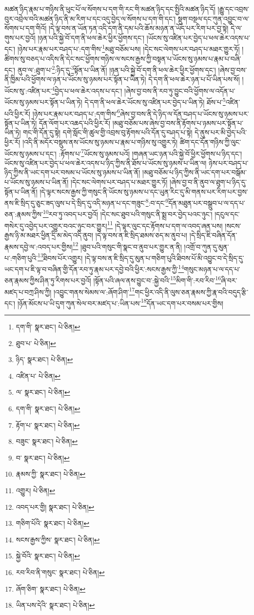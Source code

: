 མཚན་ཉིད་རྣམ་པ་གཉིས་ནི་ཕུང་པོ་ལ་སོགས་པ་དག་གི་རང་གི་མཚན་ཉིད་དང་སྤྱིའི་མཚན་ཉིད་དོ། །རྒྱུ་དང་འབྲས་བུར་འབྲེལ་བའི་མཚན་ཉིད་ནི་མ་རིག་པ་དང་འདུ་བྱེད་ལ་སོགས་པ་དག་གི་དང་། སྡུག་བསྔལ་དང་ཀུན་འབྱུང་བ་ལ་སོགས་པ་དག་གིའོ། །དེ་ལྟ་བས་ན་ཡོན་ཏན་འདི་དག་ནི་དམ་པའི་ཆོས་མཉན་ན་ཡོད་པར་རིག་པར་བྱ་སྟེ། དེ་ལ་གུས་པར་བྱའོ། །ཉན་པའི་སྐྱེ་བོ་དག་ནི་ཕལ་ཆེར་ཕྱིར་ཕྱོགས་དང་། །ཡོངས་སུ་འཛིན་པར་བྱེད་པ་ཕལ་ཆེར་འདས་པ་དང་། །ཉེས་པར་རྣམ་པར་བཤད་པ་:དག་གིས་\footnote{དག་གི་  སྣར་ཐང་།  པེ་ཅིན། }མཐུ་བཅོམ་པས། །དེང་སང་ལེགས་པར་བཤད་པ་མཐར་གྱུར་ཏོ། །ཚིགས་སུ་བཅད་པ་འདིས་ནི་དེང་སང་ཕྱོགས་གཉིས་ལ་སངས་རྒྱས་ཀྱི་བསྟན་པ་ཡོངས་སུ་ཉམས་པ་རྣམ་པ་བཞི་དང་། ནུབ་ལ་:ཐུག་པ་\footnote{ཐུབ་པ་  པེ་ཅིན། }:ཉིད་དུ་\footnote{ཉིད་  སྣར་ཐང་།  པེ་ཅིན། }སྟོན་པ་ཡིན་ནོ། །ཉན་པའི་སྐྱེ་བོ་དག་ནི་ཕལ་ཆེར་ཕྱིར་ཕྱོགས་དང་། །ཞེས་བྱ་བས་ནི་ཁྱིམ་པའི་ཕྱོགས་ལ་ཉན་པ་ཡོངས་སུ་ཉམས་པར་སྟོན་པ་ཡིན་ཏེ། དེ་དག་ནི་ཕལ་ཆེར་ཉན་པ་པོ་ཡིན་པས་སོ། །ཡོངས་སུ་:འཛིན་པར་\footnote{འཛིན་པ་  པེ་ཅིན། }བྱེད་པ་ཕལ་ཆེར་འདས་པ་དང་། །ཞེས་བྱ་བས་ནི་རབ་ཏུ་བྱུང་བའི་ཕྱོགས་ལ་འདོན་པ་ཡོངས་སུ་ཉམས་པར་སྟོན་པ་ཡིན་ཏེ། དེ་དག་ནི་ཕལ་ཆེར་ཡོངས་སུ་འཛིན་པར་བྱེད་པ་ཡིན་ཏེ། ཐོས་པ་\footnote{ལ་  སྣར་ཐང་།  པེ་ཅིན། }འཛིན་པའི་ཕྱིར་རོ། །ཉེས་པར་རྣམ་པར་བཤད་པ་:དག་གིས་\footnote{དག་གི་  སྣར་ཐང་།  པེ་ཅིན། }ཞེས་བྱ་བས་ནི་དེ་ཉིད་ལ་དོན་བཤད་པ་ཡོངས་སུ་ཉམས་པར་སྟོན་པ་ཡིན་ཏེ། དོན་ལོག་པར་འཆད་པའི་ཕྱིར་རོ། །མཐུ་བཅོམ་པས་ཞེས་བྱ་བས་ནི་རྟོགས་པ་ཉམས་པར་སྟོན་པ་ཡིན་ཏེ། གང་གི་དོན་དུ་སྟེ། དགེ་སློང་གི་ཚུལ་གྱི་འབྲས་བུ་རྟོགས་པའི་དོན་དུ་བཤད་པ་སྟེ། དེ་ནུས་པར་མི་བྱེད་པའི་ཕྱིར་རོ། །འདི་ནི་མདོར་བསྡུས་ནས་ཡོངས་སུ་ཉམས་པ་རྣམ་པ་གཉིས་སུ་འགྱུར་ཏེ། ཚིག་དང་དོན་གཉིས་ཀྱི་ལུང་ཡོངས་སུ་ཉམས་པ་དང་། :རྟོགས་པ་\footnote{རྟོག་པ་  སྣར་ཐང་།  པེ་ཅིན། }ཡོངས་སུ་ཉམས་པའོ། །གཞན་ཡང་ཉན་པའི་སྐྱེ་བོ་ཕྱིར་ཕྱོགས་པ་ཉིད་དང་། ཡོངས་སུ་འཛིན་པར་བྱེད་པ་ཕལ་ཆེར་འདས་པ་ཉིད་ཀྱིས་ནི་ཐོས་པ་ཡོངས་སུ་ཉམས་པ་ཡིན་ལ། ཉེས་པར་བཤད་པ་ཉིད་ཀྱིས་ནི་ཡང་དག་པར་བསམ་པ་ཡོངས་སུ་ཉམས་པ་ཡིན་ནོ། །མཐུ་བཅོམ་པ་ཉིད་ཀྱིས་ནི་ཡང་དག་པར་བསྒོམ་པ་ཡོངས་སུ་ཉམས་པ་ཡིན་ནོ། །དེང་སང་ལེགས་པར་བཤད་པ་མཐར་གྱུར་ཏོ། །ཞེས་བྱ་བ་ནི་ནུབ་ལ་ཐུག་པ་ཉིད་དུ་སྟོན་པ་ཡིན་ནོ། །དེ་ལྟར་སངས་རྒྱས་ཀྱི་གསུང་ནི་ཡོངས་སུ་ཉམས་པ་དང་ཡུན་རིང་དུ་མི་གནས་པར་རིག་པར་བྱས་ནས་ཇི་སྲིད་དུ་ཅུང་ཟད་ལུས་པ་དེ་སྲིད་དུ་འདི་མཉན་པ་དང་གཟུང་\footnote{བཟུང་  སྣར་ཐང་།  པེ་ཅིན། }:བ་དང་\footnote{བ་  སྣར་ཐང་།  པེ་ཅིན། }དོན་མཐུན་པར་བསྒྲུབ་པ་ལ་དད་པ་ཅན་:རྣམས་ཀྱིས་\footnote{རྣམས་ཀྱི་  སྣར་ཐང་།  པེ་ཅིན། }རབ་ཏུ་འབད་པར་བྱའོ། །དེང་སང་ཐུབ་པའི་གསུང་ནི་སྨྲ་བར་བྱེད་པའང་ཉུང་། །དངུལ་དང་གསེར་དུ་འབྱེད་པར་འགྱུར་བའང་ཉུང་བར་གྱུར།\footnote{འགྱུར།  པེ་ཅིན། } །དེ་ལྟར་ལུང་དང་རྟོགས་པ་དག་ལ་འབད་ཞན་པས། །སངས་རྒྱས་ཉི་མ་མཐར་ཕྱིན་དྲི་མ་མེད་འདི་ནུབ། །དེ་ལྟ་བས་ན་ཇི་སྲིད་ཐམས་ཅད་མ་ནུབ་པ། །དེ་སྲིད་ཇི་བཞིན་དོན་རྣམས་དབྱེ་ལ་:འབད་པར་གྱིས།\footnote{འབད་པར་གྱི།  སྣར་ཐང་།  པེ་ཅིན། } །ཐུབ་པའི་གསུང་གི་སྣང་བ་ནུབ་པར་གྱུར་ན་ནི། །འགྲོ་བ་ཀུན་དུ་མུན་པ་:གཅིག་པུའི་\footnote{གཅིག་པོའི་  སྣར་ཐང་།  པེ་ཅིན། }ཐིབས་པོར་འགྱུར། །དེ་ལྟ་བས་ན་ཇི་སྲིད་དུ་མུན་པ་གཅིག་པུའི་ཐིབས་པོ་མི་འབྱུང་བ་དེ་སྲིད་དུ་ཡང་དག་པ་ཇི་ལྟ་བ་བཞིན་གྱི་དོན་རབ་ཏུ་རྣམ་པར་དབྱེ་བའི་ཕྱིར་:སངས་རྒྱས་ཀྱི་\footnote{སངས་རྒྱས་ཀྱིས་  སྣར་ཐང་།  པེ་ཅིན། }གསུང་མཉན་པ་ལ་དད་པ་ཅན་རྣམས་ཀྱིས་ཤིན་ཏུ་རིགས་པར་བྱའོ། །སྟོན་པའི་ཞལ་ནས་བྱུང་བ་:སྐྱེ་བའི་\footnote{སྐྱེ་བོའི་  སྣར་ཐང་།  པེ་ཅིན། }མིག་གི་:རབ་རིབ་\footnote{རབ་རིབ་ནི་གསུང་  སྣར་ཐང་།  པེ་ཅིན། }ཞི་བར་མཛད་པ་བཀྲ་ཤིས་ཀྱི། །འབྱུང་གནས་སེམས་ལ་:ཞོག་ཤིག་\footnote{ཞོག་ཅིག་  སྣར་ཐང་།  པེ་ཅིན། }གང་ཕྱིར་འདི་ནི་ལུས་ཅན་རྣམས་ཀྱི་རྣ་བའི་བདུད་རྩི་དང་། །ཉོན་མོངས་པ་ཡི་དུག་ཀུན་སེལ་བར་མཛད་པ་:ཡིན་པས་\footnote{ཡིན་པས་དེའི་  སྣར་ཐང་།  པེ་ཅིན། }དོན་ཡང་དག་པར་བསམ་པར་གྱིས། 